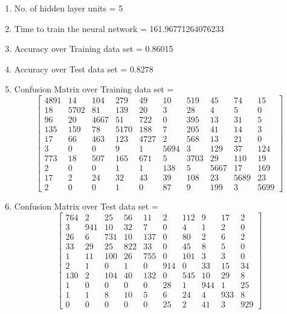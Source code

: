 \documentclass[11pt]{article}
\begin{document}
\begin{enumerate}
\item No. of hidden layer units = 5
\item Time to train the neural network = 161.96771264076233
\item Accuracy over Training data set = 0.86015
\item Accuracy over Test data set = 0.8278
\item Confusion Matrix over Training data set = 
\begin{equation}
  \begin{bmatrix}
4891 & 14 & 104 & 279 & 49 & 10 & 519 & 45 & 74 & 15\\
18 & 5702 & 81 & 139 & 20 & 3 & 28 & 4 & 5 & 0\\
96 & 20 & 4667 & 51 & 722 & 0 & 395 & 13 & 31 & 5\\
135 & 159 & 78 & 5170 & 188 & 7 & 205 & 41 & 14 & 3\\
17 & 66 & 463 & 123 & 4727 & 2 & 568 & 13 & 21 & 0\\
3 & 0 & 0 & 9 & 1 & 5694 & 3 & 129 & 37 & 124\\
773 & 18 & 507 & 165 & 671 & 5 & 3703 & 29 & 110 & 19\\
2 & 0 & 0 & 1 & 1 & 138 & 5 & 5667 & 17 & 169\\
17 & 2 & 24 & 32 & 43 & 39 & 108 & 23 & 5689 & 23\\
2 & 0 & 0 & 1 & 0 & 87 & 9 & 199 & 3 & 5699
  \end{bmatrix}
\end{equation}
\item Confusion Matrix over Test data set = 
\begin{equation}
  \begin{bmatrix}
764 & 2 & 25 & 56 & 11 & 2 & 112 & 9 & 17 & 2\\
3 & 941 & 10 & 32 & 7 & 0 & 4 & 1 & 2 & 0\\
26 & 6 & 731 & 10 & 137 & 0 & 80 & 2 & 6 & 2\\
33 & 29 & 25 & 822 & 33 & 0 & 45 & 8 & 5 & 0\\
1 & 11 & 100 & 26 & 755 & 0 & 101 & 3 & 3 & 0\\
2 & 1 & 0 & 1 & 0 & 914 & 0 & 33 & 15 & 34\\
130 & 2 & 104 & 40 & 132 & 0 & 545 & 10 & 29 & 8\\
1 & 0 & 0 & 0 & 0 & 28 & 1 & 944 & 1 & 25\\
1 & 1 & 8 & 10 & 5 & 6 & 24 & 4 & 933 & 8\\
0 & 0 & 0 & 0 & 0 & 25 & 2 & 41 & 3 & 929
  \end{bmatrix}
\end{equation}
\end{enumerate}
\end{document}
